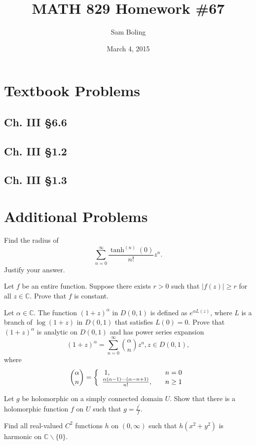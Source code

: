 \documentclass{article}
\title{MATH 829 Homework \#67}
\date{March 4, 2015}
\author{Sam Boling}
\newcounter{Problem}
\newenvironment{Problem}{\begin{Exercise}[name={Problem},
                                          counter={Problem}]}
                        {\end{Exercise}}
\begin{document}
\begin{titlepage}
\maketitle
\end{titlepage}

\section{Textbook Problems}
\subsection*{Ch. III \S 6.6}

\subsection*{Ch. III \S 1.2}

\subsection*{Ch. III \S 1.3}

\section{Additional Problems}
\begin{Problem}
Find the radius of
$$
\sum_{n=0}^\infty \frac{\tanh^{(n)}(0)}{n!} z^n.
$$
Justify your answer.
\end{Problem}

\begin{Problem}
Let $f$ be an entire function. Suppose there exists $r > 0$ such that
$|f(z)| \geq r$ for all $z \in \mathbb{C}$. Prove that $f$ is constant.
\end{Problem}

\begin{Problem}
Let $\alpha \in \mathbb{C}$. The function $(1 + z)^\alpha$ in
$D(0, 1)$ is defined as $e^{\alpha L(z)}$, where $L$ is a branch of
$\log (1 + z)$ in $D(0, 1)$ that satisfies $L(0) = 0$.
Prove that $(1 + z)^\alpha$ is analytic on $D(0, 1)$ and has
power series expansion
$$
(1 + z)^\alpha = \sum_{n=0}^\infty {\alpha \choose n} z^n, z \in D(0, 1),
$$
where
$$
{\alpha \choose n} =
\left\{\begin{array}{l l}\
  1,                                                     & \quad n = 0 \\
  \frac{\alpha(\alpha - 1) \cdots (\alpha - n + 1)}{n!}, & \quad n \geq 1
\end{array}\right.
$$
\end{Problem}

\begin{Problem}
Let $g$ be holomorphic on a simply connected domain $U$. Show that there is a
holomorphic function $f$ on $U$ such that $g = \frac{f^\prime}{f}$.
\end{Problem}

\begin{Problem}
Find all real-valued $C^2$ functions $h$ on $(0, \infty)$ such that
$h(x^2 + y^2)$ is harmonic on $\mathbb{C} \backslash \{ 0 \}$.
\end{Problem}
\end{document}
